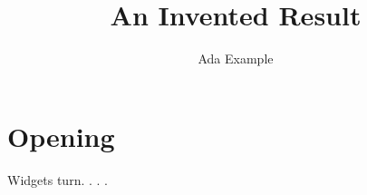 \documentclass{inventedkernel}
\title{An Invented Result}
\author{Ada Example}
\begin{document}
\maketitle
\section{Opening}
Widgets turn. \inventedsize. \inventedcat. \textit\inventedname.
\end{document}
